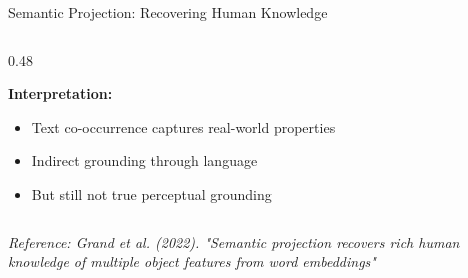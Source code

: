 \documentclass[aspectratio=169]{beamer}
\begin{document}
\begin{frame}[shrink=10]{Semantic Projection: Recovering Human Knowledge 🔬}
\begin{columns}[T]
\begin{column}{0.48\textwidth}
\begin{center}
\end{center}

\vspace{0.5em}
\textbf{Interpretation:}
\begin{itemize}\setlength{\itemsep}{0pt}
    \item Text co-occurrence captures real-world properties
    \item Indirect grounding through language
    \item But still not true perceptual grounding
\end{itemize}
\end{column}
\end{columns}

\vspace{0.5em}
\small
\textit{Reference: Grand et al. (2022). "Semantic projection recovers rich human knowledge of multiple object features from word embeddings"}
\end{frame}
\end{document}
